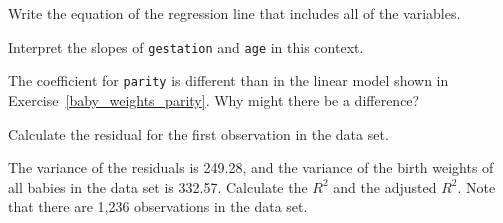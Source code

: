 {\begin{center}
\end{center}
\begin{parts}
\item Write the equation of the regression line that includes all of the 
variables.
\item Interpret the slopes of \texttt{gestation} and \texttt{age} in this 
context.
\item The coefficient for \texttt{parity} is different than in the linear 
model shown in Exercise~\ref{baby_weights_parity}. Why might there be a 
difference?
\item Calculate the residual for the first observation in the data set.
\item The variance of the residuals is 249.28, and the variance of the birth 
weights of all babies in the data set is 332.57. Calculate the $R^2$ and the 
adjusted $R^2$. Note that there are 1,236 observations in the data set.
\end{parts}
}{}


